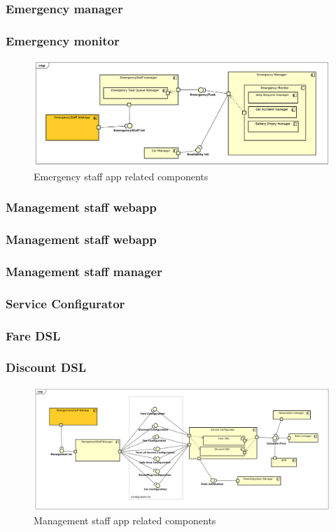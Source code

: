 \documentclass[english]{article}
\begin{document}
	\subsubsection{Emergency manager}
		\subsubsection{Emergency monitor}
	\begin{figure}[H]
		\centering
		\includegraphics[scale=0.35]{./ComponentDiagrams/EmergencyStaff.pdf}%
		\caption{Emergency staff app related components}
	\end{figure}
	
	
\subsubsection*{Management staff webapp}

	\subsubsection{Management staff webapp}
	\subsubsection{Management staff manager}
	\subsubsection{Service Configurator}
		\subsubsection{Fare DSL}
		\subsubsection{Discount DSL}
	\begin{figure}[H]
		\centering
		\includegraphics[scale=0.26]{./ComponentDiagrams/ManagementStaff.pdf}%
		\caption{Management staff app related components}
	\end{figure}
	
\end{document}
